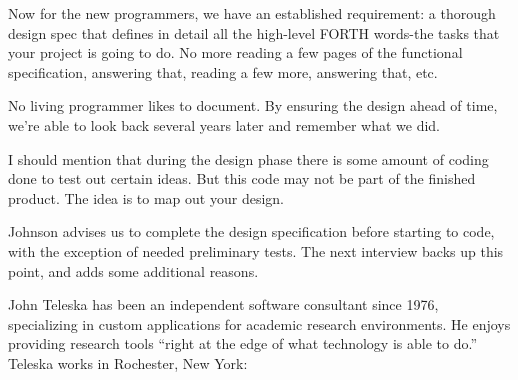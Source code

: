 \begin{tfquot}
\noindent Now for the new programmers, we have an established requirement: a
thorough design spec that defines in detail all the high-level FORTH
words-the tasks that your project is going to do. No more reading a few
pages of the functional specification, answering that, reading a few more,
answering that, etc.

\noindent No living programmer likes to document. By ensuring the design ahead of
time, we're able to look back several years later and remember what we did.

\noindent I should mention that during the design phase there is some amount of
coding done to test out certain ideas. But this code may not be part of the
finished product. The idea is to map out your design.
\end{tfquot}
\blackline{1ex}

\noindent Johnson advises us to complete the design specification before starting
to code, with the exception of needed preliminary tests. The next
interview backs up this point, and adds some additional reasons.

\bigskip\blackline{2ex}
\noindent John Teleska has been an independent software consultant since 1976,
specializing in custom applications for academic research environments.
He enjoys providing research tools ``right at the edge of what technology
is able to do.'' Teleska works in Rochester, New York:

